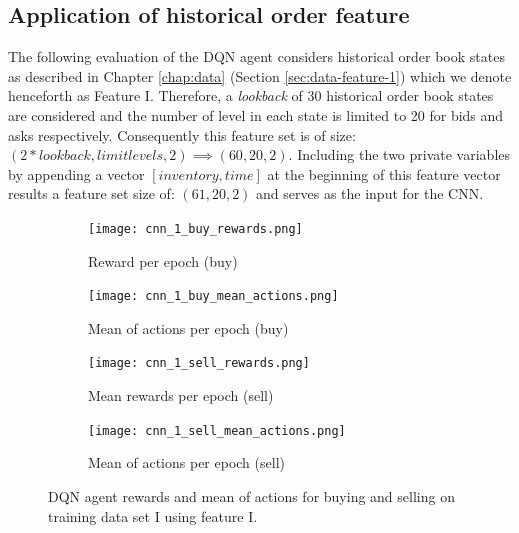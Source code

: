 \subsection{Application of historical order feature}

The following evaluation of the DQN agent considers historical order book states as described in Chapter \ref{chap:data} (Section \ref{sec:data-feature-1}) which we denote henceforth as Feature I.
Therefore, a \textit{lookback} of 30 historical order book states are considered and the number of level in each state is limited to 20 for bids and asks respectively.
Consequently this feature set is of size: $(2*lookback, limit levels, 2) \implies (60, 20, 2)$.
Including the two private variables by appending a vector $[inventory, time]$ at the beginning of this feature vector results a feature set size of: $(61, 20, 2)$ and serves as the input for the CNN.

\begin{figure}[H]
    \centering
    \begin{subfigure}[b]{0.4\textwidth}
        \texttt{[image: cnn\_1\_buy\_rewards.png]}
        \caption{Reward per epoch (buy)}
        \label{fig:analysis-dqn-1-reward-buy}
    \end{subfigure}
    \begin{subfigure}[b]{0.4\textwidth}
        \texttt{[image: cnn\_1\_buy\_mean\_actions.png]}
        \caption{Mean of actions per epoch (buy)}
        \label{fig:analysis-dqn-1-action-buy}
    \end{subfigure}
    \begin{subfigure}[b]{0.4\textwidth}
        \texttt{[image: cnn\_1\_sell\_rewards.png]}
        \caption{Mean rewards per epoch (sell)}
        \label{fig:analysis-dqn-1-reward-sell}
    \end{subfigure}
    \begin{subfigure}[b]{0.4\textwidth}
        \texttt{[image: cnn\_1\_sell\_mean\_actions.png]}
        \caption{Mean of actions per epoch (sell)}
        \label{fig:analysis-dqn-1-action-sell}
    \end{subfigure}
    \caption{DQN agent rewards and mean of actions for buying and selling on training data set I using feature I.}
    \label{fig:analysis-dqn-1}
\end{figure}

